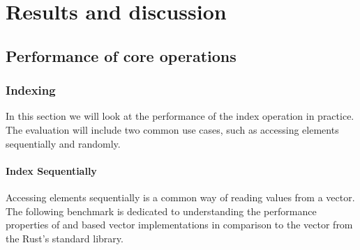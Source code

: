 

\chapter{Results and discussion}
\section{Performance of core operations}

\subsection{Indexing}

In this section we will look at the performance of the index operation in practice. The evaluation will include two common use cases, such as accessing elements sequentially and randomly. %

\subsubsection*{Index Sequentially}

Accessing elements sequentially is a common way of reading values from a vector. The following benchmark is dedicated to understanding the performance properties of \rbtree{} and \rrbtree{} based vector implementations in comparison to the vector from the Rust's standard library. 


